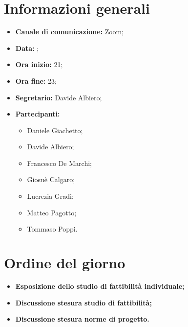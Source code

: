 \section{Informazioni generali}

\begin{itemize}

	\item \textbf{Canale di comunicazione:} Zoom;
	
	\item \textbf{Data:} \DataMeeting{};
	
	\item \textbf{Ora inizio:} 21;
	
	\item \textbf{Ora fine:} 23;
	
	\item \textbf{Segretario:} Davide Albiero;
	
	\item \textbf{Partecipanti:}
	
		\begin{itemize}
		
			\item Daniele Giachetto;
			\item Davide Albiero;
			\item Francesco De Marchi;
			\item Giosuè Calgaro;
			\item Lucrezia Gradi;
			\item Matteo Pagotto;
			\item Tommaso Poppi.
				 
		\end{itemize}

\end{itemize}

\section{Ordine del giorno}

\begin{itemize}

	\item\textbf{Esposizione dello studio di fattibilità individuale;}

	\item\textbf{Discussione stesura studio di fattibilità;}

	\item\textbf{Discussione stesura norme di progetto.}

\end{itemize}

